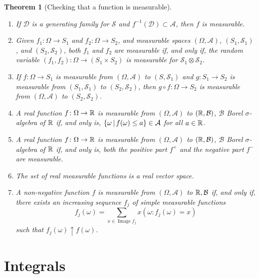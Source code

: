 \documentclass[12pt,a4paper]{amsart}
\theoremstyle{plain}
\newtheorem{theorem}{Theorem}%
\theoremstyle{definition}
\theoremstyle{remark}
\begin{document}
\begin{theorem}[Checking that a function is
  measurable]\label{th:checkmeasurable}\
  \begin{enumerate}
  \item If $\mathcal D$ is a generating family for $\mathcal S$ and
    $f^{-1}(\mathcal D) \subset \mathcal A$, then $f$ is measurable.
  \item Given $f_1 \colon \Omega \to S_1$ and $f_2 \colon \Omega \to
    S_2$, and measurable spaces $(\Omega,\mathcal A)$, $(S_1,\mathcal
    S_1)$, and $(S_2,\mathcal S_2)$, both $f_1$ and $f_2$ are
    measurable if, and only if, the random variable $(f_1,f_2) \colon
    \Omega \to (S_1 \times S_2)$ is measurable for $\mathcal S_1
    \otimes \mathcal S_2$.
  \item If $f \colon \Omega \to S_1$ is measurable from
    $(\Omega,\mathcal A)$ to $(S,\mathcal S_1)$ and
    $g \colon S_1 \to S_2$ is measurable from $(S_1,\mathcal S_1)$ to
    $(S_2,\mathcal S_2)$, then $g \circ f \colon \Omega \to S_2$ is
    measurable from $(\Omega,\mathcal A)$ to $(S_2,\mathcal
    S_2)$.
  \item A real function $f \colon \Omega \to \mathbb{R}$ is measurable
    from $(\Omega,\mathcal A)$ to $(\mathbb{R},\mathcal B)$, $\mathcal B$
    Borel $\sigma$-algebra of $\mathbb{R}$ if, and only is,
    $\left\{\omega \, \middle| \, f(\omega) \leq a \right\} \in \mathcal A$ for all
    $a \in \mathbb{R}$.
  \item A real function $f \colon \Omega \to \mathbb{R}$ is measurable
    from $(\Omega,\mathcal A)$ to $(\mathbb{R},\mathcal B)$, $\mathcal B$
    Borel $\sigma$-algebra of $\mathbb{R}$ if, and only is, both the
    positive part $f^+$ and the negative part $f^-$ are measurable.
  \item The set of real measurable functions is a real vector space.
  \item \label{item:upsimple} A non-negative function $f$ is measurable from
    $(\Omega,\mathcal A)$ to $\mathbb{R},\mathcal B$ if, and only if,
    there exists an increasing sequence $f_j$ of simple measurable
    functions
    \begin{equation*}
      f_j(\omega) = \sum_{x \in \operatorname{Image} f_j} x (\omega : f_j(\omega) = x)
    \end{equation*}
such that $f_j(\omega) \uparrow f(\omega)$.
  \end{enumerate}
\end{theorem}
\section{Integrals}
\label{sec:integrals}
\end{document}
